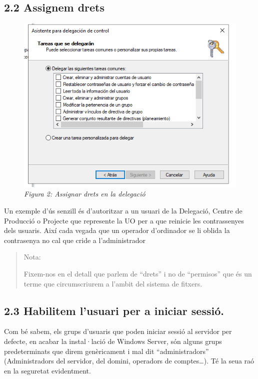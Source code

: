 \documentclass[
  a4paper,
]{article}
\begin{document}
\subsection{2.2 Assignem drets}\label{assignem-drets}

\begin{figure}
\centering
\includegraphics{png/DelegarControl2.png}
\caption{\emph{Figura 2: Assignar drets en la delegació}}
\end{figure}

Un exemple d'ús senzill és d'autoritzar a un usuari de la Delegació,
Centre de Producció o Projecte que represente la UO per a que reinicie
les contrassenyes dels usuaris. Així cada vegada que un operador
d'ordinador se li oblida la contrasenya no cal que cride a
l'administrador

\begin{quote}
Nota:

Fixem-nos en el detall que parlem de ``drets'' i no de ``permisos'' que
és un terme que circumscriurem a l'ambit del sistema de fitxers.
\end{quote}

\subsection{2.3 Habilitem l'usuari per a iniciar
sessió.}\label{habilitem-lusuari-per-a-iniciar-sessiuxf3.}

Com bé sabem, els grups d'usuaris que poden iniciar sessió al servidor
per defecte, en acabar la instal·lació de Windows Server, són alguns
grups predeterminats que direm genèricament i mal dit ``administradors''
(Administradors del servidor, del domini, operadors de comptes\ldots).
Té la seua raó en la seguretat evidentment.
\end{document}
